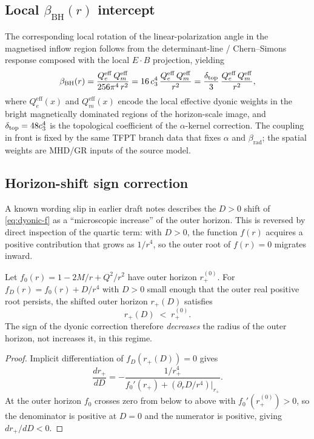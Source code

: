 \documentclass[11pt,a4paper]{article}
\begin{document}
\subsection{Local $\beta_{\mathrm{BH}}(r)$ intercept}

The corresponding local rotation of the linear-polarization angle in the magnetised inflow region
follows from the determinant-line / Chern--Simons response composed with the local $E\!\cdot\!B$
projection, yielding
\begin{equation}
\label{eq:beta-bh-companion}
\beta_{\mathrm{BH}}(r)
=
\frac{Q_e^{\mathrm{eff}}\,Q_m^{\mathrm{eff}}}{256\pi^4\,r^2}
=
16\,c_3^4\,\frac{Q_e^{\mathrm{eff}}\,Q_m^{\mathrm{eff}}}{r^2}
=
\frac{\delta_{\mathrm{top}}}{3}\,\frac{Q_e^{\mathrm{eff}}\,Q_m^{\mathrm{eff}}}{r^2},
\end{equation}
where $Q_e^{\mathrm{eff}}(x)$ and $Q_m^{\mathrm{eff}}(x)$ encode the local effective dyonic
weights in the bright magnetically dominated regions of the horizon-scale image, and
$\delta_{\mathrm{top}}=48c_3^4$ is the topological coefficient of the $\alpha$-kernel correction. The
coupling in front is fixed by the same TFPT branch data that fixes $\alpha$ and
$\beta_{\mathrm{rad}}$; the spatial weights are MHD/GR inputs of the source model.

\subsection{Horizon-shift sign correction}
\label{ssec:horizon-shift-correction}

A known wording slip in earlier draft notes describes the $D>0$ shift of \eqref{eq:dyonic-f} as a
``microscopic increase'' of the outer horizon. This is reversed by direct inspection of the
quartic term: with $D>0$, the function $f(r)$ acquires a positive contribution that grows as
$1/r^4$, so the outer root of $f(r)=0$ migrates inward.

\begin{lemma}
\label{lem:horizon-shift-sign}
Let $f_0(r)=1-2M/r+Q^2/r^2$ have outer horizon $r_+^{(0)}$. For
$f_D(r)=f_0(r)+D/r^4$ with $D>0$ small enough that the outer real positive root persists, the
shifted outer horizon $r_+(D)$ satisfies
\[
r_+(D) \;<\; r_+^{(0)}.
\]
The sign of the dyonic correction therefore \emph{decreases} the radius of the outer horizon, not
increases it, in this regime.
\end{lemma}

\begin{proof}
Implicit differentiation of $f_D(r_+(D))=0$ gives
\[
\frac{dr_+}{dD}=-\frac{1/r_+^{4}}{f_0'(r_+)+(\partial_r D/r^4)|_{r_+}}.
\]
At the outer horizon $f_0$ crosses zero from below to above with $f_0'(r_+^{(0)})>0$, so the
denominator is positive at $D=0$ and the numerator is positive, giving $dr_+/dD<0$.
\end{proof}
\end{document}
